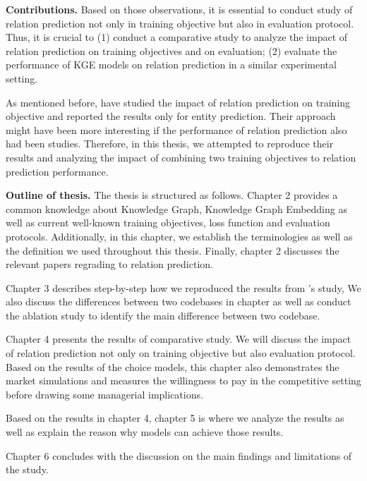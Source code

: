 \noindent\textbf{Contributions.} Based on those observations, it is essential to conduct study of relation prediction not only in training objective but also in evaluation protocol. Thus, it is crucial to (1) conduct a comparative study to analyze the impact of relation prediction on training objectives and on evaluation; (2) evaluate the performance of KGE models on relation prediction in a similar experimental setting. 

As mentioned before, \citet{chen2021relation} have studied the impact of relation prediction on training objective and reported the results only for entity prediction. Their approach might have been more interesting if the performance of relation prediction also had been studies. Therefore, in this thesis, we attempted to reproduce their results and analyzing the impact of combining two training objectives to relation prediction performance. 
\newline

\noindent\textbf{Outline of thesis.} The thesis is structured as follows. Chapter 2 provides a common knowledge about Knowledge Graph, Knowledge Graph Embedding as well as current well-known training objectives, loss function and evaluation protocols. Additionally, in this chapter, we establish the terminologies as well as the definition we used throughout this thesis. Finally, chapter 2 discusses the relevant papers regrading to relation prediction. 

Chapter 3 describes step-by-step how we reproduced the results from \citet{chen2021relation}'s study, We also discuss the differences between two codebases in chapter as well as conduct the ablation study to identify the main difference between two codebase. 

Chapter 4 presents the results of comparative study. We will discuss the impact of relation prediction not only on training objective but also evaluation protocol. Based on the results of the choice models, this chapter also demonstrates the market simulations and measures the willingness to pay in the competitive setting before drawing some managerial implications. 

Based on the results in chapter 4, chapter 5 is where we analyze the results as well as explain the reason why models can achieve those results.

Chapter 6 concludes with the discussion on the main findings and limitations of the study.





